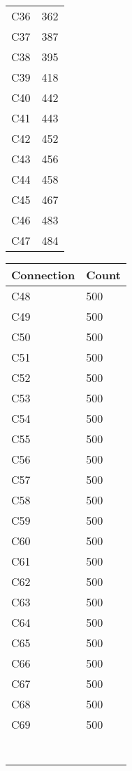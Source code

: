\begin{table}[!htbp]
\begin{center}
\begin{minipage}{0.30\textwidth}
\begin{tabular}{|l | l|}
			C36 & 362\\
			C37 & 387\\
			C38 & 395\\
			C39 & 418\\
			C40 & 442\\
			C41 & 443\\
			C42 & 452\\
			C43 & 456\\
			C44 & 458\\
			C45 & 467\\
			C46 & 483\\
			C47 & 484\\
			\hline
		\end{tabular}
	\end{minipage}	
	\begin{minipage}{0.30\textwidth}
		\begin{tabular}{|l | l|}
			\hline
			\multicolumn{1}{|c|}{Connection} & \multicolumn{1}{c|}{Count}\\
			\hline
			C48 & 500\\
			C49 & 500\\
			C50 & 500\\
			C51 & 500\\
			C52 & 500\\
			C53 & 500\\
			C54 & 500\\
			C55 & 500\\
			C56 & 500\\
			C57 & 500\\
			C58 & 500\\
			C59 & 500\\
			C60 & 500\\
			C61 & 500\\
			C62 & 500\\
			C63 & 500\\
			C64 & 500\\
			C65 & 500\\
			C66 & 500\\
			C67 & 500\\
			C68 & 500\\
			C69 & 500\\
			 & \\
			 & \\
			 & \\
			 & \\
			 & \\
			 & \\
			 & \\

\end{tabular}
\end{minipage}
\end{center}
\end{table}
